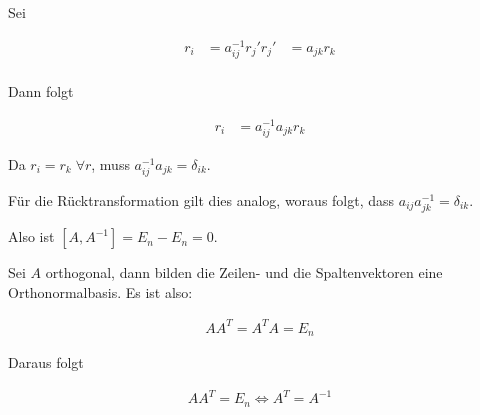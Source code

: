\documentclass[a4paper,german,12pt,smallheadings]{scrartcl}
\begin{document}
Sei

\begin{align*}
  r_i  &= a^{-1}_{ij} r_j'
  r_j' &= a_{jk} r_k \\
\end{align*}

Dann folgt

\begin{align*}
   r_i  &= a^{-1}_{ij} a_{jk} r_k
\end{align*}

Da $r_i = r_k\;\forall r$, muss $a^{-1}_{ij} a_{jk} = \delta_{ik}$.

Für die Rücktransformation gilt dies analog, woraus folgt, dass $a_{ij}
a^{-1}_{jk} = \delta_{ik}$.

Also ist $[A, A^{-1}] = E_n - E_n = 0$.

Sei $A$ orthogonal, dann bilden die Zeilen- und die Spaltenvektoren eine Orthonormalbasis. Es ist also:

\begin{align*}
  AA^T = A^TA = E_n
\end{align*}

Daraus folgt

\begin{align*}
  AA^T = E_n \Leftrightarrow A^T = A^{-1}
\end{align*}
\end{document}
